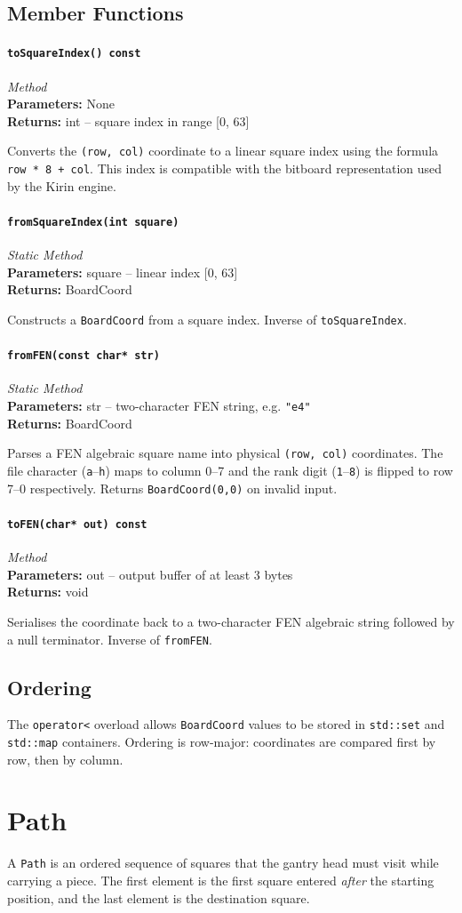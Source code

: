 \documentclass[11pt,a4paper]{report}
\newcommand{\function}[4]{%
    \paragraph{\texttt{#1}} \hfill \textit{#2}\\
    \textbf{Parameters:} #3\\
    \textbf{Returns:} #4
}
\begin{document}
\subsection{Member Functions}

\function{toSquareIndex() const}{Method}{None}{int -- square index in range [0, 63]}

Converts the \texttt{(row, col)} coordinate to a linear square index using the formula \texttt{row * 8 + col}. This index is compatible with the bitboard representation used by the Kirin engine.

\function{fromSquareIndex(int square)}{Static Method}{square -- linear index [0, 63]}{BoardCoord}

Constructs a \texttt{BoardCoord} from a square index. Inverse of \texttt{toSquareIndex}.

\function{fromFEN(const char* str)}{Static Method}{str -- two-character FEN string, e.g. \texttt{"e4"}}{BoardCoord}

Parses a FEN algebraic square name into physical \texttt{(row, col)} coordinates. The file character (\texttt{a}--\texttt{h}) maps to column 0--7 and the rank digit (\texttt{1}--\texttt{8}) is flipped to row 7--0 respectively. Returns \texttt{BoardCoord(0,0)} on invalid input.

\function{toFEN(char* out) const}{Method}{out -- output buffer of at least 3 bytes}{void}

Serialises the coordinate back to a two-character FEN algebraic string followed by a null terminator. Inverse of \texttt{fromFEN}.

\subsection{Ordering}

The \texttt{operator<} overload allows \texttt{BoardCoord} values to be stored in \texttt{std::set} and \texttt{std::map} containers. Ordering is row-major: coordinates are compared first by row, then by column.

\section{Path}

A \texttt{Path} is an ordered sequence of squares that the gantry head must visit while carrying a piece. The first element is the first square entered \emph{after} the starting position, and the last element is the destination square.
\end{document}
